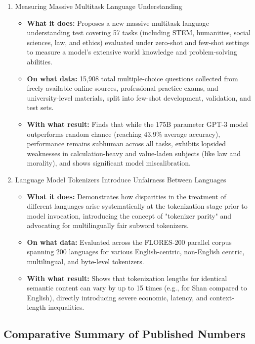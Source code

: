 \documentclass{article}
\begin{document}
\begin{enumerate}
    \item Measuring Massive Multitask Language Understanding \textbf{\cite{hendrycks2021measuring}}
    \begin{itemize}
        \item \textbf{What it does:} Proposes a new massive multitask language understanding test covering 57 tasks (including STEM, humanities, social sciences, law, and ethics) evaluated under zero-shot and few-shot settings to measure a model's extensive world knowledge and problem-solving abilities.
        \item \textbf{On what data:} 15,908 total multiple-choice questions collected from freely available online sources, professional practice exams, and university-level materials, split into few-shot development, validation, and test sets.
        \item \textbf{With what result:} Finds that while the 175B parameter GPT-3 model outperforms random chance (reaching 43.9\% average accuracy), performance remains subhuman across all tasks, exhibits lopsided weaknesses in calculation-heavy and value-laden subjects (like law and morality), and shows significant model miscalibration.
    \end{itemize}

    \item Language Model Tokenizers Introduce Unfairness Between Languages \textbf{\cite{petrov2023language}}
    \begin{itemize}
        \item \textbf{What it does:} Demonstrates how disparities in the treatment of different languages arise systematically at the tokenization stage prior to model invocation, introducing the concept of "tokenizer parity" and advocating for multilingually fair subword tokenizers.
        \item \textbf{On what data:} Evaluated across the FLORES-200 parallel corpus spanning 200 languages for various English-centric, non-English centric, multilingual, and byte-level tokenizers.
        \item \textbf{With what result:} Shows that tokenization lengths for identical semantic content can vary by up to 15 times (e.g., for Shan compared to English), directly introducing severe economic, latency, and context-length inequalities.
    \end{itemize}
\end{enumerate}

\clearpage

\subsection*{Comparative Summary of Published Numbers}
\end{document}
